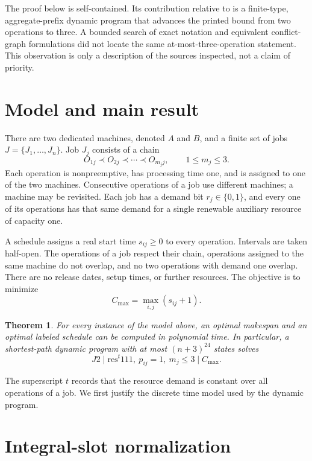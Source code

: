 \documentclass[11pt]{article}
\newtheorem{theorem}{Theorem}
\newcommand{\Cmax}{C_{\max}}
\begin{document}
The proof below is self-contained.  Its contribution relative to
\cite{TellacheAzerine2026} is a finite-type, aggregate-prefix dynamic program
that advances the printed bound from two operations to three.  A bounded
search of exact notation and equivalent conflict-graph formulations did not
locate the same at-most-three-operation statement.  This observation is only
a description of the sources inspected, not a claim of priority.

\section{Model and main result}

There are two dedicated machines, denoted $A$ and $B$, and a finite set of
jobs $J=\{J_1,\ldots,J_n\}$.  Job $J_j$ consists of a chain
\[
 O_{1j}\prec O_{2j}\prec\cdots\prec O_{m_jj},
 \qquad 1\leq m_j\leq 3.
\]
Each operation is nonpreemptive, has processing time one, and is assigned to
one of the two machines.  Consecutive operations of a job use different
machines; a machine may be revisited.  Each job has a demand bit
$r_j\in\{0,1\}$, and every one of its operations has that same demand for a
single renewable auxiliary resource of capacity one.

A schedule assigns a real start time $s_{ij}\geq0$ to every operation.
Intervals are taken half-open.  The operations of a job respect their chain,
operations assigned to the same machine do not overlap, and no two operations
with demand one overlap.  There are no release dates, setup times, or further
resources.  The objective is to minimize
\[
 \Cmax=\max_{i,j}(s_{ij}+1).
\]

\begin{theorem}\label{thm:main}
For every instance of the model above, an optimal makespan and an optimal
labeled schedule can be computed in polynomial time.  In particular, a
shortest-path dynamic program with at most $(n+3)^{24}$ states solves
\[
 J2\mid \mathrm{res}^{t}111,\ p_{ij}=1,\ m_j\leq3\mid \Cmax.
\]
\end{theorem}

The superscript $t$ records that the resource demand is constant over all
operations of a job.  We first justify the discrete time model used by the
dynamic program.

\section{Integral-slot normalization}
\end{document}
